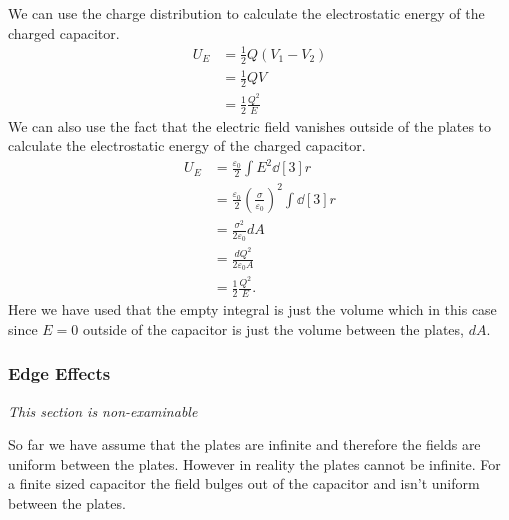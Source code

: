     We can use the charge distribution to calculate the electrostatic energy of the charged capacitor.
    \begin{align*}
        U_E &= \frac{1}{2}Q(V_1 - V_2)\\
        &= \frac{1}{2}QV\\
        &= \frac{1}{2}\frac{Q^2}{E}
    \end{align*}
    We can also use the fact that the electric field vanishes outside of the plates to calculate the electrostatic energy of the charged capacitor.
    \begin{align*}
        U_E &= \frac{\varepsilon_0}{2}\int E^2\dd[3]{r}\\
        &= \frac{\varepsilon_0}{2} \left(\frac{\sigma}{\varepsilon_0}\right)^2 \int\dd[3]{r}\\
        &= \frac{\sigma^2}{2\varepsilon_0}dA\\
        &= \frac{dQ^2}{2\varepsilon_0A}\\
        &= \frac{1}{2}\frac{Q^2}{E}.
    \end{align*}
    Here we have used that the empty integral is just the volume which in this case since \(E = 0\) outside of the capacitor is just the volume between the plates, \(dA\).
    
    \subsubsection{Edge Effects}
    \textit{This section is non-examinable}
    
    So far we have assume that the plates are infinite and therefore the fields are uniform between the plates.
    However in reality the plates cannot be infinite.
    For a finite sized capacitor the field bulges out of the capacitor and isn't uniform between the plates.
    
